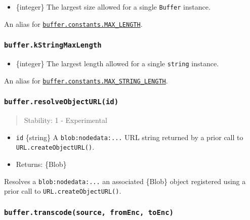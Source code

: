 \begin{itemize}
\tightlist
\item
  \{integer\} The largest size allowed for a single \texttt{Buffer}
  instance.
\end{itemize}

An alias for
\hyperref[bufferconstantsmax_length]{\texttt{buffer.constants.MAX\_LENGTH}}.

\subsubsection{\texorpdfstring{\texttt{buffer.kStringMaxLength}}{buffer.kStringMaxLength}}\label{buffer.kstringmaxlength}

\begin{itemize}
\tightlist
\item
  \{integer\} The largest length allowed for a single \texttt{string}
  instance.
\end{itemize}

An alias for
\hyperref[bufferconstantsmax_string_length]{\texttt{buffer.constants.MAX\_STRING\_LENGTH}}.

\subsubsection{\texorpdfstring{\texttt{buffer.resolveObjectURL(id)}}{buffer.resolveObjectURL(id)}}\label{buffer.resolveobjecturlid}

\begin{quote}
Stability: 1 - Experimental
\end{quote}

\begin{itemize}
\tightlist
\item
  \texttt{id} \{string\} A \texttt{\textquotesingle{}blob:nodedata:...}
  URL string returned by a prior call to \texttt{URL.createObjectURL()}.
\item
  Returns: \{Blob\}
\end{itemize}

Resolves a
\texttt{\textquotesingle{}blob:nodedata:...\textquotesingle{}} an
associated \{Blob\} object registered using a prior call to
\texttt{URL.createObjectURL()}.

\subsubsection{\texorpdfstring{\texttt{buffer.transcode(source,\ fromEnc,\ toEnc)}}{buffer.transcode(source, fromEnc, toEnc)}}\label{buffer.transcodesource-fromenc-toenc}

